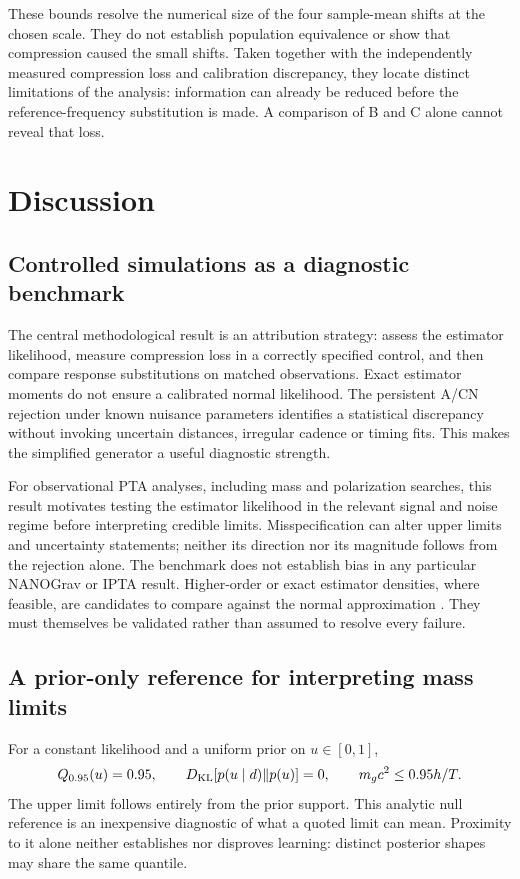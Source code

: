 \documentclass[11pt,a4paper]{article}
\begin{document}
These bounds resolve the numerical size of the four sample-mean shifts at the chosen scale. They do not establish population equivalence or show that compression caused the small shifts. Taken together with the independently measured compression loss and calibration discrepancy, they locate distinct limitations of the analysis: information can already be reduced before the reference-frequency substitution is made. A comparison of B and C alone cannot reveal that loss.

\section{Discussion}
\subsection{Controlled simulations as a diagnostic benchmark}
The central methodological result is an attribution strategy: assess the estimator likelihood, measure compression loss in a correctly specified control, and then compare response substitutions on matched observations. Exact estimator moments do not ensure a calibrated normal likelihood. The persistent A/CN rejection under known nuisance parameters identifies a statistical discrepancy without invoking uncertain distances, irregular cadence or timing fits. This makes the simplified generator a useful diagnostic strength.

For observational PTA analyses, including mass and polarization searches, this result motivates testing the estimator likelihood in the relevant signal and noise regime before interpreting credible limits. Misspecification can alter upper limits and uncertainty statements; neither its direction nor its magnitude follows from the rejection alone. The benchmark does not establish bias in any particular NANOGrav or IPTA result. Higher-order or exact estimator densities, where feasible, are candidates to compare against the normal approximation \cite{franciolini2025}. They must themselves be validated rather than assumed to resolve every failure.

\subsection{A prior-only reference for interpreting mass limits}
For a constant likelihood and a uniform prior on $u\in[0,1]$,
\begin{equation}
 Q_{0.95}(u)=0.95,\qquad D_{\rm KL}[p(u\mid d)\Vert p(u)]=0,
 \qquad m_gc^2\leq0.95h/T.
\end{equation}
The upper limit follows entirely from the prior support. This analytic null reference is an inexpensive diagnostic of what a quoted limit can mean. Proximity to it alone neither establishes nor disproves learning: distinct posterior shapes may share the same quantile.
\end{document}
